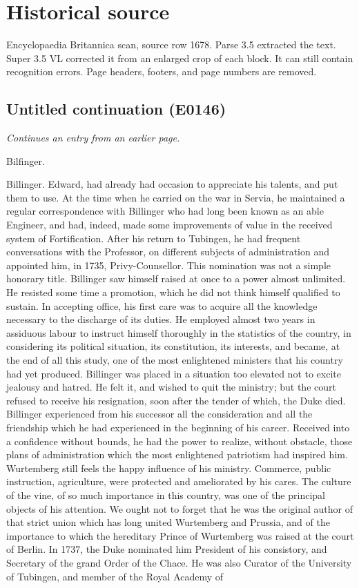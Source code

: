 \documentclass{article}
\begin{document}
\section*{Historical source}
Encyclopaedia Britannica scan, source row 1678. Parse 3.5 extracted the text. Super 3.5 VL corrected it from an enlarged crop of each block. It can still contain recognition errors.
Page headers, footers, and page numbers are removed.

\subsection*{Untitled continuation (E0146)}
\textit{Continues an entry from an earlier page.}

Bilfinger.

Billinger. Edward, had already had occasion to appreciate his talents, and put them to use. At the time when he carried on the war in Servia, he maintained a regular correspondence with Billinger who had long been known as an able Engineer, and had, indeed, made some improvements of value in the received system of Fortification. After his return to Tubingen, he had frequent conversations with the Professor, on different subjects of administration and appointed him, in 1735, Privy-Counsellor. This nomination was not a simple honorary title. Billinger saw himself raised at once to a power almost unlimited. He resisted some time a promotion, which he did not think himself qualified to sustain. In accepting office, his first care was to acquire all the knowledge necessary to the discharge of its duties. He employed almost two years in assiduous labour to instruct himself thoroughly in the statistics of the country, in considering its political situation, its constitution, its interests, and became, at the end of all this study, one of the most enlightened ministers that his country had yet produced. Billinger was placed in a situation too elevated not to excite jealousy and hatred. He felt it, and wished to quit the ministry; but the court refused to receive his resignation, soon after the tender of which, the Duke died. Billinger experienced from his successor all the consideration and all the friendship which he had experienced in the beginning of his career. Received into a confidence without bounds, he had the power to realize, without obstacle, those plans of administration which the most enlightened patriotism had inspired him. Wurtemberg still feels the happy influence of his ministry. Commerce, public instruction, agriculture, were protected and ameliorated by his cares. The culture of the vine, of so much importance in this country, was one of the principal objects of his attention. We ought not to forget that he was the original author of that strict union which has long united Wurtemberg and Prussia, and of the importance to which the hereditary Prince of Wurtemberg was raised at the court of Berlin. In 1737, the Duke nominated him President of his consistory, and Secretary of the grand Order of the Chace. He was also Curator of the University of Tubingen, and member of the Royal Academy of
\end{document}
